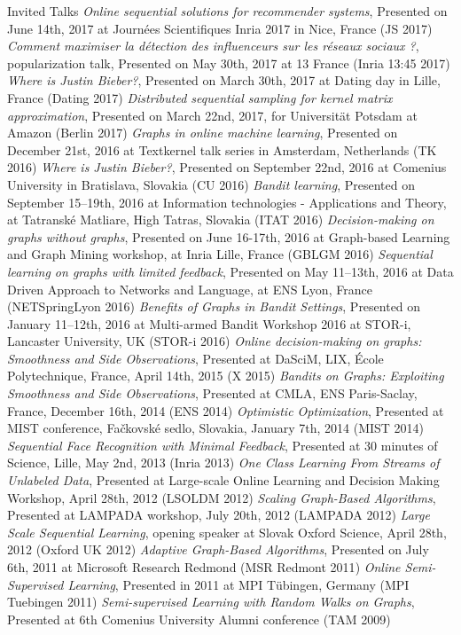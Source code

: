 \documentclass{resume}
\begin{document}
\begin{category}{Invited Talks}
\citembullet
\emph{Online sequential solutions for recommender systems}, Presented on June 14th, 2017 at Journ\'ees Scientifiques Inria 2017 in Nice, France  
({\sf JS 2017})
\citembullet
\emph{Comment maximiser la d\'etection des influenceurs sur les r\'eseaux sociaux ?}, popularization talk, Presented on May 30th, 2017  at 13 France 
({\sf Inria 13:45 2017})
\citembullet
\emph{Where is Justin Bieber?}, Presented on March 30th, 2017  at Dating day  in Lille, France 
({\sf Dating 2017})
\citembullet
\emph{Distributed sequential sampling for kernel matrix approximation}, Presented on  March 22nd, 2017, for Universit\" at Potsdam at Amazon 
({\sf Berlin 2017})
\citembullet
\emph{Graphs in online machine learning}, Presented on December 21st, 2016 at Textkernel talk series in Amsterdam, Netherlands 
({\sf TK 2016})
\citembullet
\emph{Where is Justin Bieber?}, Presented on September 22nd, 2016 at Comenius University in Bratislava, Slovakia 
({\sf CU 2016})
\citembullet
\emph{Bandit learning}, Presented on September 15--19th, 2016 at Information technologies - Applications and Theory, at Tatransk\' e Matliare, High Tatras, Slovakia
({\sf ITAT 2016})
\citembullet
\emph{Decision-making on graphs without graphs}, Presented on June 16-17th, 2016 at Graph-based Learning and Graph Mining workshop, at Inria Lille, France
({\sf GBLGM 2016})
\citembullet
\emph{Sequential learning on graphs with limited feedback}, Presented on May 11--13th, 2016 at Data Driven Approach to Networks and Language, at ENS Lyon, France
({\sf NETSpringLyon 2016})
\citembullet
\emph{Benefits of Graphs in Bandit Settings}, Presented on January 11--12th, 2016 at Multi-armed Bandit Workshop 2016 at STOR-i, Lancaster University, UK 
({\sf STOR-i 2016})
\citembullet
\emph{Online decision-making on graphs: Smoothness and Side Observations},
 Presented  at DaSciM, LIX, \'Ecole Polytechnique, France, April 14th, 2015 
({\sf X 2015})
\citembullet
\emph{Bandits on Graphs: Exploiting Smoothness and Side Observations},
 Presented  at CMLA, ENS Paris-Saclay, France, December 16th, 2014 
({\sf ENS 2014})
\citembullet
  \emph{Optimistic Optimization},
 Presented  at MIST conference, Fa\v ckovsk\' e sedlo, Slovakia, January 7th, 2014
({\sf MIST 2014})
\citembullet
\emph{Sequential Face Recognition with Minimal Feedback},
Presented at 30 minutes of Science, Lille, May 2nd, 2013 ({\sf Inria 2013})
\citembullet
 \emph{One Class Learning From Streams of Unlabeled Data},
Presented at Large-scale Online Learning and Decision Making Workshop,
April 28th, 2012 ({\sf LSOLDM 2012})
\citembullet
 \emph{Scaling Graph-Based Algorithms}, Presented at
LAMPADA workshop, July 20th, 2012 ({\sf LAMPADA 2012})
\citembullet
\emph{Large Scale Sequential Learning}, opening speaker at
Slovak Oxford Science, April 28th, 2012 ({\sf Oxford UK 2012})
\citembullet
 \emph{Adaptive Graph-Based Algorithms}, Presented on July
6th, 2011 at Microsoft Research Redmond ({\sf MSR Redmont 2011})
\citembullet
 \emph{Online Semi-Supervised Learning}, Presented in 2011
at MPI T\"{u}bingen, Germany ({\sf MPI Tuebingen 2011})
\citembullet
 \emph{Semi-supervised Learning with Random Walks on
Graphs}, Presented at 6th Comenius University Alumni conference ({\sf TAM 2009})
\end{category}
\end{document}
